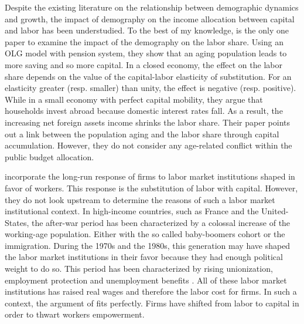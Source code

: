 Despite the existing literature on the relationship between demographic dynamics and growth, the impact of demography on the income allocation between capital and labor has been understudied. 
To the best of my knowledge, \cite{Schmidt2013} is the only one paper to examine the impact of the demography on the labor share. Using an OLG model with pension system, they show that an aging population leads to more saving and so more capital. In a closed economy, the effect on the labor share depends on the value of the capital-labor elasticity of substitution. For an elasticity greater (resp. smaller) than unity, the effect is negative (resp. positive). While in a small economy with perfect capital mobility, they argue that households invest abroad because domestic interest rates fall. As a result, the increasing net foreign assets income shrinks the labor share. Their paper points out a link between the population aging and the labor share through capital accumulation. However, they do not consider any age-related conflict within the public budget allocation.

\cite{Caballero1998} incorporate the long-run response of firms to labor market institutions shaped in favor of workers. This response is the substitution of labor with capital. However, they do not look upstream to determine the reasons of such a labor market institutional context. In high-income countries, such as France and the United-States, the after-war period has been characterized by a colossal increase of the working-age population. Either with the so called baby-boomers cohort or the immigration. During the 1970s and the 1980s, this generation may have shaped the labor market institutions in their favor because they had enough political weight to do so. This period has been characterized by rising unionization, employment protection and unemployment benefits%
. All of these labor market institutions has raised real wages and therefore the labor cost for firms. In such a context, the argument of \cite{Caballero1998} fits perfectly. Firms have shifted from labor to capital in order to thwart workers empowerment.


